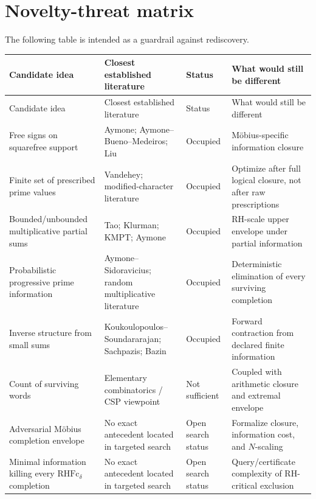 \documentclass[11pt]{article}
\newcommand{\RHFc}{\mathrm{RHFc}}
\begin{document}
\section{Novelty-threat matrix}
The following table is intended as a guardrail against rediscovery.
\small
\setlength{\tabcolsep}{4pt}
\begin{longtable}{p{}p{}p{}p{}}
\toprule
Candidate idea & Closest established literature & Status & What would still be different \\
\midrule
\endfirsthead
\toprule
Candidate idea & Closest established literature & Status & What would still be different \\
\midrule
\endhead
Free signs on squarefree support & Aymone; Aymone--Bueno--Medeiros; Liu & Occupied & Möbius-specific information closure \\
Finite set of prescribed prime values & Vandehey; modified-character literature & Occupied & Optimize after full logical closure, not after raw prescriptions \\
Bounded/unbounded multiplicative partial sums & Tao; Klurman; KMPT; Aymone & Occupied & RH-scale upper envelope under partial information \\
Probabilistic progressive prime information & Aymone--Sidoravicius; random multiplicative literature & Occupied & Deterministic elimination of every surviving completion \\
Inverse structure from small sums & Koukoulopoulos--Soundararajan; Sachpazis; Bazin & Occupied & Forward contraction from declared finite information \\
Count of surviving words & Elementary combinatorics / CSP viewpoint & Not sufficient & Coupled with arithmetic closure and extremal envelope \\
Adversarial Möbius completion envelope & No exact antecedent located in targeted search & Open search status & Formalize closure, information cost, and $N$-scaling \\
Minimal information killing every $\RHFc_\delta$ completion & No exact antecedent located in targeted search & Open search status & Query/certificate complexity of RH-critical exclusion \\
\bottomrule
\end{longtable}
\normalsize
\setlength{\tabcolsep}{6pt}
\end{document}
